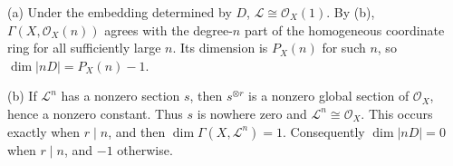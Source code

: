 (a) Under the embedding determined by $D$, $\mathcal L\cong\mathcal O_X(1)$. By (b), $\Gamma(X,\mathcal O_X(n))$ agrees with the degree-$n$ part of the homogeneous coordinate ring for all sufficiently large $n$. Its dimension is $P_X(n)$ for such $n$, so $\dim|nD|=P_X(n)-1$.

(b) If $\mathcal L^n$ has a nonzero section $s$, then $s^{\otimes r}$ is a nonzero global section of $\mathcal O_X$, hence a nonzero constant. Thus $s$ is nowhere zero and $\mathcal L^n\cong\mathcal O_X$. This occurs exactly when $r\mid n$, and then $\dim\Gamma(X,\mathcal L^n)=1$. Consequently $\dim|nD|=0$ when $r\mid n$, and $-1$ otherwise.
